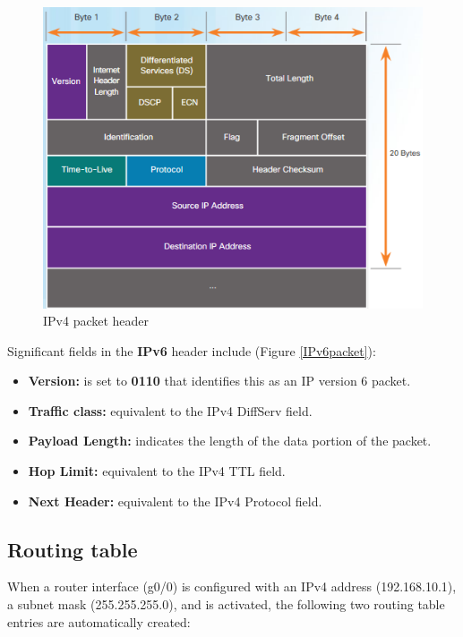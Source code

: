 \begin{figure}[hbtp]
\caption{IPv4 packet header}\label{IPv4packet}
\centering
\includegraphics[scale=0.6]{pictures/IPv4packet.PNG}
\end{figure}

Significant fields in the \textbf{IPv6} header include (Figure \ref{IPv6packet}):

\begin{itemize}
\item \textbf{Version:} is set to \textbf{0110} that identifies this as an IP version 6 packet.

\item \textbf{Traffic class:} equivalent to the IPv4 DiffServ field.

\item \textbf{Payload Length:} indicates the length of the data portion of the packet.

\item \textbf{Hop Limit:} equivalent to the IPv4 TTL field.

\item \textbf{Next Header:} equivalent to the IPv4 Protocol field.
\end{itemize}

\subsection{Routing table}

When a router interface (g0/0) is configured with an IPv4 address (192.168.10.1), a subnet mask (255.255.255.0), and is activated, the following two routing table entries are automatically created:


